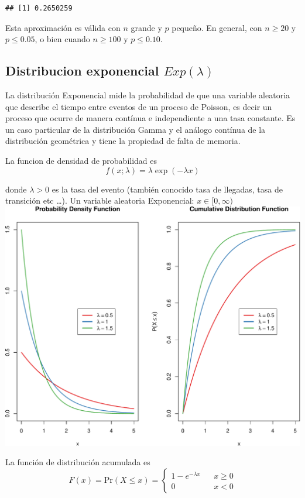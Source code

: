 \documentclass[]{article}
\numberwithin{equation}{section}
\begin{document}
\begin{verbatim}
## [1] 0.2650259
\end{verbatim}

Esta aproximación es válida con \(n\) grande y \(p\) pequeño. En
general, con \(n \geq 20\) y \(p\leq0.05\), o bien cuando \(n\geq 100\)
y \(p\leq 0.10\).

\subsection{\texorpdfstring{Distribucion exponencial
\(Exp(\lambda)\)}{Distribucion exponencial Exp(\textbackslash{}lambda)}}\label{distribucion-exponencial-explambda}

La distribución Exponencial mide la probabilidad de que una variable
aleatoria que describe el tiempo entre eventos de un proceso de Poisson,
es decir un proceso que ocurre de manera contínua e independiente a una
tasa constante. Es un caso particular de la distribución Gamma y el
análogo contínua de la distribución geométrica y tiene la propiedad de
falta de memoria.

La funcion de densidad de probabilidad es \[
f(x;\lambda) =  \lambda \exp(-\lambda x)
\]

donde \(\lambda>0\) es la tasa del evento (también conocido tasa de
llegadas, tasa de transición etc \ldots{}). Un variable aleatoria
Exponencial: \(x \in [0,\infty)\)
\includegraphics{tema4_files/figure-latex/unnamed-chunk-10-1.pdf}

La función de distribución acumulada es \[
F(x) = \mbox{Pr}(X\leq x) = 
  \left\{
    \begin{array}{lcc}
      1- e^{-\lambda x} & & x\geq 0 \\
      0                 & & x < 0
    \end{array}
  \right.
\]
\end{document}
